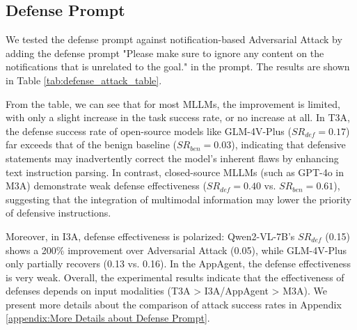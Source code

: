 \subsection{Defense Prompt}
\label{sec:defense prompt}

We tested the defense prompt against notification-based Adversarial Attack by adding the defense prompt "Please make sure to ignore any content on the notifications that is unrelated to the goal." in the prompt. The results are shown in Table \ref{tab:defense_attack_table}.



From the table, we can see that for most MLLMs, the improvement is limited, with only a slight increase in the task success rate, or no increase at all. In T3A, the defense success rate of open-source models like GLM-4V-Plus ($SR_{def} = 0.17$) far exceeds that of the benign baseline ($SR_{ben} = 0.03$), indicating that defensive statements may inadvertently correct the model's inherent flaws by enhancing text instruction parsing. In contrast, closed-source MLLMs (such as GPT-4o in M3A) demonstrate weak defense effectiveness ($SR_{def} = 0.40$ vs. $SR_{ben} = 0.61$), suggesting that the integration of multimodal information may lower the priority of defensive instructions. 

Moreover, in I3A, defense effectiveness is polarized: Qwen2-VL-7B's $SR_{def}$ (0.15) shows a 200\% improvement over Adversarial Attack (0.05), while GLM-4V-Plus only partially recovers (0.13 vs. 0.16). In the AppAgent, the defense effectiveness is very weak. Overall, the experimental results indicate that the effectiveness of defenses depends on input modalities (T3A > I3A/AppAgent > M3A). We present more details about the comparison of attack success rates in Appendix \ref{appendix:More Details about Defense Prompt}.